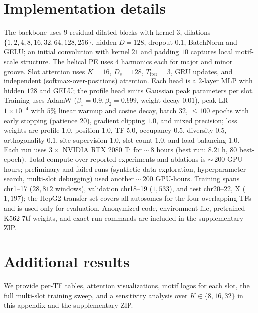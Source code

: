 \documentclass{article}
\begin{document}
\section{Implementation details}
The backbone uses $9$ residual dilated blocks with kernel $3$, dilations $\{1,2,4,8,16,32,64,128,256\}$, hidden $D{=}128$, dropout $0.1$, BatchNorm and GELU; an initial convolution with kernel $21$ and padding $10$ captures local motif-scale structure. The helical PE uses $4$ harmonics each for major and minor groove. Slot attention uses $K{=}16$, $D_s{=}128$, $T_{\text{iter}}{=}3$, GRU updates, and independent (softmax-over-positions) attention. Each head is a $2$-layer MLP with hidden $128$ and GELU; the profile head emits Gaussian peak parameters per slot. Training uses AdamW ($\beta_1{=}0.9, \beta_2{=}0.999$, weight decay $0.01$), peak LR $1{\times}10^{-4}$ with $5\%$ linear warmup and cosine decay, batch $32$, $\le 100$ epochs with early stopping (patience $20$), gradient clipping $1.0$, and mixed precision; loss weights are profile $1.0$, position $1.0$, TF $5.0$, occupancy $0.5$, diversity $0.5$, orthogonality $0.1$, site supervision $1.0$, slot count $1.0$, and load balancing $1.0$. Each run uses $3\times$ NVIDIA RTX 2080 Ti for $\sim$\,$8$ hours (best run: $8.21$\,h, $80$ best-epoch). Total compute over reported experiments and ablations is $\sim$\,$200$ GPU-hours; preliminary and failed runs (synthetic-data exploration, hyperparameter search, multi-slot debugging) used another $\sim$\,$200$ GPU-hours. Training spans chr1--17 ($28{,}812$ windows), validation chr18--19 ($1{,}533$), and test chr20--22, X ($1{,}197$); the HepG2 transfer set covers all autosomes for the four overlapping TFs and is used only for evaluation. Anonymized code, environment file, pretrained K562-7tf weights, and exact run commands are included in the supplementary ZIP.

\section{Additional results}
We provide per-TF tables, attention visualizations, motif logos for each slot, the full multi-slot training sweep, and a sensitivity analysis over $K\!\in\!\{8,16,32\}$ in this appendix and the supplementary ZIP.

\newpage

\end{document}
